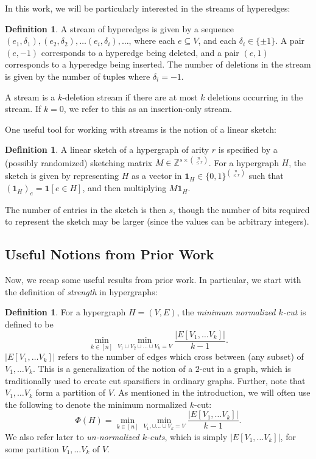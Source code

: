 \documentclass[11pt]{article}
\theoremstyle{definition}
\newtheorem{definition}[theorem]{Definition}
\newcommand{\zo}{\{0, 1\}}
\begin{document}
In this work, we will be particularly interested in the streams of hyperedges:

\begin{definition}
	A stream of hyperedges is given by a sequence $(e_1, \delta_1), (e_2, \delta_2), \dots (e_i, \delta_i), \dots$, where each $e \subseteq V$, and each $\delta_i \in \{\pm 1\}$. A pair $(e, -1)$ corresponds to a hyperedge being deleted, and a pair $(e, 1)$ corresponds to a hyperedge being inserted. The number of deletions in the stream is given by the number of tuples where $\delta_i = -1$.
	
	A stream is a $k$-deletion stream if there are at most $k$ deletions occurring in the stream. If $k = 0$, we refer to this as an insertion-only stream.
	\end{definition}
	
One useful tool for working with streams is the notion of a linear sketch:

\begin{definition}
	A linear sketch of a hypergraph of arity $r$ is specified by a (possibly randomized) sketching matrix $M \in \mathbb{Z}^{s \times \binom{n}{\leq r}}$. For a hypergraph $H$, the sketch is given by representing $H$ as a vector in $\mathbf{1}_H \in \zo^{\binom{n}{\leq r}}$ such that $(\mathbf{1}_H)_e = \mathbf{1}[e \in H]$, and then multiplying $M \mathbf{1}_H$. 
	
	The number of entries in the sketch is then $s$, though the number of bits required to represent the sketch may be larger (since the values can be arbitrary integers).
\end{definition}

\subsection{Useful Notions from Prior Work}

Now, we recap some useful results from prior work. In particular, we start with the definition of \emph{strength} in hypergraphs:

\begin{definition}
	For a hypergraph $H = (V, E)$, the \emph{minimum normalized $k$-cut} is defined to be 
	\[
	\min_{k \in [n]} \min_{V_1 \cup V_2 \cup \dots \cup V_k = V} \frac{|E[V_1, \dots V_k]|}{k-1}.
	\]
	$|E[V_1, \dots V_k]|$ refers to the number of edges which cross between (any subset) of $V_1, \dots V_k$. This is a generalization of the notion of a $2$-cut in a graph, which is traditionally used to create cut sparsifiers in ordinary graphs. Further, note that $V_1, \dots V_k$ form a partition of $V$. As mentioned in the introduction, we will often use the following to denote the minimum normalized $k$-cut:
	\[
	\Phi(H) = \min_{k \in [n]} \min_{V_1, \cup  \dots \cup V_k = V} \frac{|E[V_1, \dots V_k]|}{k-1}.
	\]
	We also refer later to \emph{un-normalized $k$-cuts}, which is simply $|E[V_1, \dots V_k]|$, for some partition $V_1, \dots V_k$ of $V$.
\end{definition}
\end{document}
